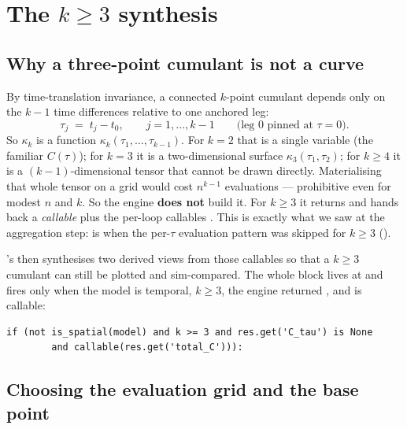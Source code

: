 \section{The \texorpdfstring{$k\!\ge\!3$}{k>=3} synthesis}\label{sec:kge3}

\subsection{Why a three-point cumulant is not a curve}

By time-translation invariance, a connected $k$-point cumulant depends only on the
$k-1$ time differences relative to one anchored leg:
\begin{equation}
  \tau_j \;=\; t_j - t_0,\qquad j=1,\ldots,k-1
  \qquad\text{(leg $0$ pinned at $\tau=0$)}.
  \label{eq:taudiffs}
\end{equation}
So $\kappa_k$ is a function $\kappa_k(\tau_1,\ldots,\tau_{k-1})$. For $k=2$ that is
a single variable (the familiar $C(\tau)$); for $k=3$ it is a two-dimensional
surface $\kappa_3(\tau_1,\tau_2)$; for $k\ge4$ it is a $(k-1)$-dimensional tensor
that cannot be drawn directly. Materialising that whole tensor on a grid would cost
$n^{k-1}$ evaluations --- prohibitive even for modest $n$ and $k$. So the engine
\textbf{does not} build it. For $k\ge3$ it returns  and hands
back a \emph{callable}  plus the per-loop callables
. This is exactly what we saw at the
aggregation step:  is  when the per-$\tau$ evaluation
pattern was skipped for $k\ge3$ ().

\Daedalus{}'s  then synthesises two derived views from those callables so
that a $k\ge3$ cumulant can still be plotted and sim-compared. The whole block
lives at  and fires only when the model is
temporal, $k\ge3$, the engine returned , and 
is callable:

\begin{lstlisting}
if (not is_spatial(model) and k >= 3 and res.get('C_tau') is None
        and callable(res.get('total_C'))):
\end{lstlisting}

\subsection{Choosing the evaluation grid and the base point}

